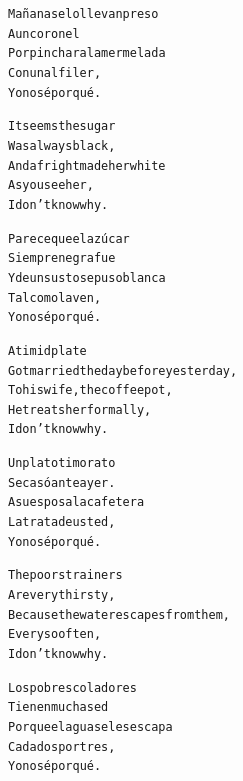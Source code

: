 \documentclass[11pt,a4paper]{article}
\begin{document}
\begin{parcolumns}{2}
\colchunk
{
\begin{alltt}\normalfont
Mañana se lo llevan preso
A un coronel
Por pinchar a la mermelada
Con un alfiler,
Yo no sé por qué.
\end{alltt}
}

\colplacechunks

\colchunk
{
\begin{alltt}\normalfont
It seems the sugar
Was always black,
And a fright made her white
As you see her,
I don’t know why.
\end{alltt}
}

\colchunk
{
\begin{alltt}\normalfont
Parece que el azúcar
Siempre negra fue
Y de un susto se puso blanca
Tal como la ven,
Yo no sé por qué.
\end{alltt}
}

\colplacechunks

\colchunk
{
\begin{alltt}\normalfont
A timid plate
Got married the day before yesterday,
To his wife, the coffee pot,
He treats her formally,
I don’t know why.
\end{alltt}
}

\colchunk
{
\begin{alltt}\normalfont
Un plato timorato
Se casó anteayer.
A su esposa la cafetera
La trata de usted,
Yo no sé por qué.
\end{alltt}
}

\colplacechunks

\colchunk
{
\begin{alltt}\normalfont
The poor strainers
Are very thirsty,
Because the water escapes from them,
Every so often,
I don’t know why.
\end{alltt}
}

\colchunk
{
\begin{alltt}\normalfont
Los pobres coladores
Tienen mucha sed
Porque el agua se les escapa
Cada dos por tres,
Yo no sé por qué.
\end{alltt}
}

\colplacechunks

\end{parcolumns}
\end{document}
